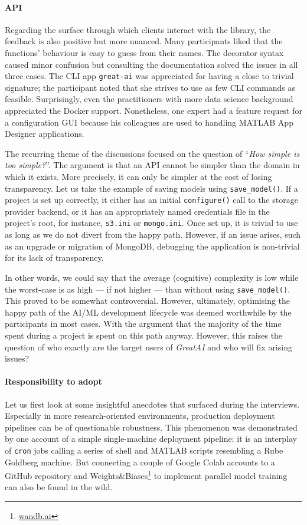 \paragraph{API} Regarding the surface through which clients interact with the library, the feedback is also positive but more nuanced. Many participants liked that the functions' behaviour is easy to guess from their names. The decorator syntax caused minor confusion but consulting the documentation solved the issues in all three cases. The CLI app \texttt{great-ai} was appreciated for having a close to trivial signature; the participant noted that she strives to use as few CLI commands as feasible. Surprisingly, even the practitioners with more data science background appreciated the Docker support. Nonetheless, one expert had a feature request for a configuration GUI because his colleagues are used to handling MATLAB App Designer applications.

The recurring theme of the discussions focused on the question of ``\textit{How simple is too simple?}''. The argument is that an API cannot be simpler than the domain in which it exists. More precisely, it can only be simpler at the cost of losing transparency. Let us take the example of saving models using \texttt{save\_model()}. If a project is set up correctly, it either has an initial \texttt{configure()} call to the storage provider backend, or it has an appropriately named credentials file in the project's root, for instance, \texttt{s3.ini} or \texttt{mongo.ini}. Once set up, it is trivial to use as long as we do not divert from the happy path. However, if an issue arises, such as an upgrade or migration of MongoDB, debugging the application is non-trivial for its lack of transparency.

In other words, we could say that the average (cognitive) complexity is low while the worst-case is as high --- if not higher --- than without using \texttt{save\_model()}. This proved to be somewhat controversial. However, ultimately, optimising the happy path of the AI/ML development lifecycle was deemed worthwhile by the participants in most cases. With the argument that the majority of the time spent during a project is spent on this path anyway. However, this raises the question of who exactly are the target users of \textit{GreatAI} and who will fix arising issues?

\paragraph{Responsibility to adopt} Let us first look at some insightful anecdotes that surfaced during the interviews. Especially in more research-oriented environments, production deployment pipelines can be of questionable robustness. This phenomenon was demonstrated by one account of a simple single-machine deployment pipeline: it is an interplay of \texttt{cron} jobs calling a series of shell and MATLAB scripts resembling a Rube Goldberg machine. But connecting a couple of Google Colab accounts to a GitHub repository and Weights\&Biases\footnote{\href{https://wandb.ai/site}{wandb.ai}} to implement parallel model training can also be found in the wild.


